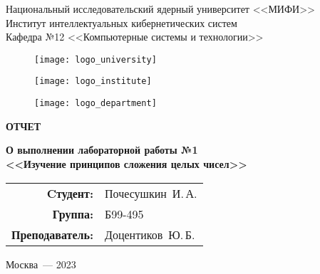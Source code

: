 \begin{titlepage}
  \begin{center}
    \begin{large}
      Национальный исследовательский ядерный университет <<МИФИ>> \\
      \vspace{0.25cm}
      Институт интеллектуальных кибернетических систем \\
      \vspace{0.25cm}
      Кафедра №12 <<Компьютерные системы и технологии>>
    \end{large}

    \vspace*{1cm}

    \begin{figure}[H]
      \centering
      \begin{minipage}[c]{0.3\textwidth}
        \texttt{[image: logo\_university]}
      \end{minipage}
      \hfill
      \begin{minipage}[c]{0.3\textwidth}
        \texttt{[image: logo\_institute]}
      \end{minipage}
      \hfill
      \begin{minipage}[c]{0.3\textwidth}
        \texttt{[image: logo\_department]}
      \end{minipage}
    \end{figure}

    \vspace{4cm}

    \begin{huge}
      \textbf{ОТЧЕТ}
    \end{huge}

    \begin{large}
      \textbf{О выполнении лабораторной работы №1 \\
        <<Изучение принципов сложения целых чисел>>}
    \end{large}

    \vfill

    \begin{flushright}
      \begin{tabular}{ r l }
        \textbf{Cтудент:} & Почесушкин~И.\,А. \\
        \textbf{Группа:} & Б99-495 \\
        \textbf{Преподаватель:} & Доцентиков~Ю.\,Б. \\
      \end{tabular}
    \end{flushright}

    Москва~--- 2023
  \end{center}
\end{titlepage}
